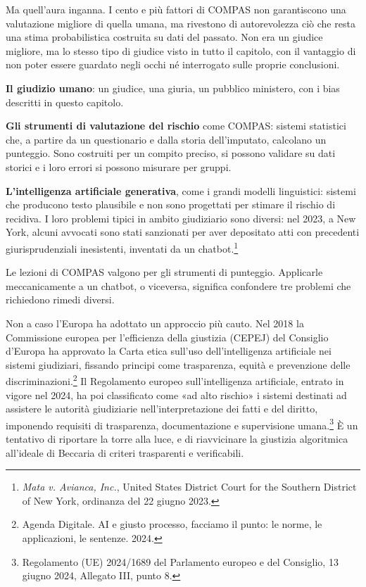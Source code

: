 Ma quell'aura inganna. I cento e pi\`{u} fattori di COMPAS non garantiscono una valutazione migliore di quella umana, ma rivestono di autorevolezza ci\`{o} che resta una stima probabilistica costruita su dati del passato. Non era un giudice migliore, ma lo stesso tipo di giudice visto in tutto il capitolo, con il vantaggio di non poter essere guardato negli occhi n\'{e} interrogato sulle proprie conclusioni.

\begin{concetto}
\textbf{Il giudizio umano}: un giudice, una giuria, un pubblico ministero, con i bias descritti in questo capitolo.

\textbf{Gli strumenti di valutazione del rischio} come COMPAS: sistemi statistici che, a partire da un questionario e dalla storia dell'imputato, calcolano un punteggio. Sono costruiti per un compito preciso, si possono validare su dati storici e i loro errori si possono misurare per gruppi.

\textbf{L'intelligenza artificiale generativa}, come i grandi modelli linguistici: sistemi che producono testo plausibile e non sono progettati per stimare il rischio di recidiva. I loro problemi tipici in ambito giudiziario sono diversi: nel 2023, a New York, alcuni avvocati sono stati sanzionati per aver depositato atti con precedenti giurisprudenziali inesistenti, inventati da un chatbot.\footnote{\textit{Mata v. Avianca, Inc.}, United States District Court for the Southern District of New York, ordinanza del 22 giugno 2023.}

Le lezioni di COMPAS valgono per gli strumenti di punteggio. Applicarle meccanicamente a un chatbot, o viceversa, significa confondere tre problemi che richiedono rimedi diversi.
\end{concetto}

Non a caso l'Europa ha adottato un approccio pi\`{u} cauto. Nel 2018 la Commissione europea per l'efficienza della giustizia (CEPEJ) del Consiglio d'Europa ha approvato la Carta etica sull'uso dell'intelligenza artificiale nei sistemi giudiziari, fissando principi come trasparenza, equit\`{a} e prevenzione delle discriminazioni.\footnote{Agenda Digitale. AI e giusto processo, facciamo il punto: le norme, le applicazioni, le sentenze. 2024.} Il Regolamento europeo sull'intelligenza artificiale, entrato in vigore nel 2024, ha poi classificato come «ad alto rischio» i sistemi destinati ad assistere le autorità giudiziarie nell'interpretazione dei fatti e del diritto, imponendo requisiti di trasparenza, documentazione e supervisione umana.\footnote{Regolamento (UE) 2024/1689 del Parlamento europeo e del Consiglio, 13 giugno 2024, Allegato III, punto 8.} \`{E} un tentativo di riportare la torre alla luce, e di riavvicinare la giustizia algoritmica all'ideale di Beccaria di criteri trasparenti e verificabili.

